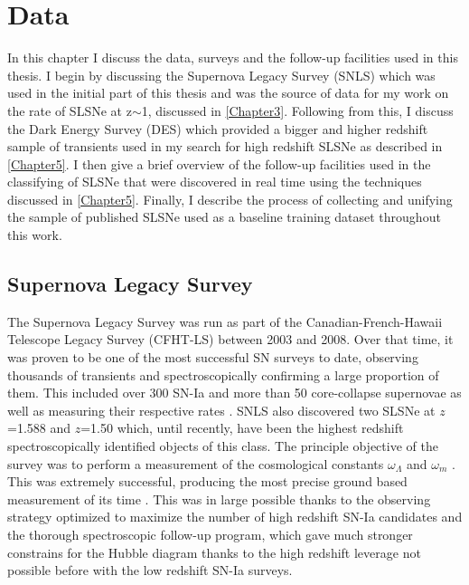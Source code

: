 
\chapter{Data} %
\label{Chapter2}

In this chapter I discuss the data, surveys and the follow-up facilities used in this thesis. I begin by discussing the Supernova Legacy Survey (SNLS) which was used in the initial part of this thesis and was the source of data for my work on the rate of SLSNe at z$\sim$1, discussed in \cref{Chapter3}. Following from this, I discuss the Dark Energy Survey (DES) which provided a bigger and higher redshift sample of transients used in my search for high redshift SLSNe as described in \cref{Chapter5}. I then give a brief overview of the follow-up facilities used in the classifying of SLSNe that were discovered in real time using the techniques discussed in \cref{Chapter5}. Finally, I describe the process of collecting and unifying the sample of published SLSNe used as a baseline training dataset throughout this work.

\section{Supernova Legacy Survey}
The Supernova Legacy Survey \citep{Boulade2003,Pritchet2004} was run as part of the Canadian-French-Hawaii Telescope Legacy Survey (CFHT-LS) between 2003 and 2008. Over that time, it was proven to be one of the most successful SN surveys to date, observing thousands of transients and spectroscopically confirming a large proportion of them. This included over 300 SN-Ia \citep{Perrett2010} and more than 50 core-collapse supernovae as well as measuring their respective rates \citep{Perrett2012,Bazin2009}. SNLS also discovered two SLSNe at $z$=1.588 and $z$=1.50 \citep{Howell2013} which, until recently, have been the highest redshift spectroscopically identified objects of this class. The principle objective of the survey was to perform a measurement of the cosmological constants $\omega_{\Lambda}$ and $\omega_{m}$ \citep{Astier2006}. This was extremely successful, producing the most precise ground based measurement of its time \citep{Sullivan2006}. This was in large possible thanks to the observing strategy optimized to maximize the number of high redshift SN-Ia candidates and the thorough spectroscopic follow-up program, which gave much stronger constrains for the Hubble diagram thanks to the high redshift leverage not possible before with the low redshift SN-Ia surveys.

